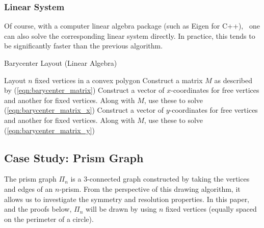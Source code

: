 \documentclass[11pt]{report}
\begin{document}
\subsubsection{Linear System}
Of course, with a computer linear algebra package (such as Eigen for C++),~\cite{eigen} one can also solve the corresponding linear system directly. In practice, this tends to be significantly faster than the previous algorithm.

\begin{algorithm}[H]
    \caption{Barycenter Layout (Linear Algebra)}\label{barycenter_la}
    \begin{algorithmic}[1]       
        \State Layout $n$ fixed vertices in a convex polygon
        \State Construct a matrix $M$ as described by (\ref{eqn:barycenter_matrix})
        \State Construct a vector of $x$-coordinates for free vertices and another for fixed vertices. Along with $M$, use these to solve (\ref{eqn:barycenter_matrix_x})
        \State Construct a vector of $y$-coordinates for free vertices and another for fixed vertices. Along with $M$, use these to solve (\ref{eqn:barycenter_matrix_y})
        \EndProcedure
    \end{algorithmic}
\end{algorithm}

\subsection{Case Study: Prism Graph}
The prism graph $\Pi_{n}$ is a 3-connected graph constructed by taking the vertices and edges of an $n$-prism. From the perspective of this drawing algorithm, it allows us to investigate the symmetry and resolution properties. In this paper, and the proofs below, $\Pi_{n}$ will be drawn by using $n$ fixed vertices (equally spaced on the perimeter of a circle).
\end{document}
